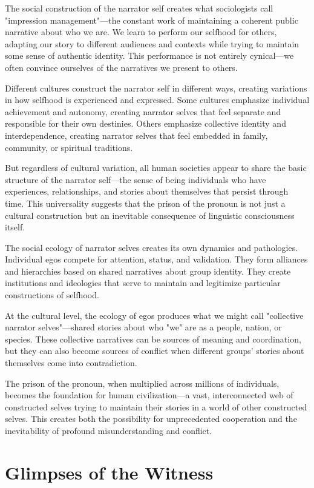 The social construction of the narrator self creates what sociologists call "impression management"—the constant work of maintaining a coherent public narrative about who we are. We learn to perform our selfhood for others, adapting our story to different audiences and contexts while trying to maintain some sense of authentic identity. This performance is not entirely cynical—we often convince ourselves of the narratives we present to others.

Different cultures construct the narrator self in different ways, creating variations in how selfhood is experienced and expressed. Some cultures emphasize individual achievement and autonomy, creating narrator selves that feel separate and responsible for their own destinies. Others emphasize collective identity and interdependence, creating narrator selves that feel embedded in family, community, or spiritual traditions.

But regardless of cultural variation, all human societies appear to share the basic structure of the narrator self—the sense of being individuals who have experiences, relationships, and stories about themselves that persist through time. This universality suggests that the prison of the pronoun is not just a cultural construction but an inevitable consequence of linguistic consciousness itself.

The social ecology of narrator selves creates its own dynamics and pathologies. Individual egos compete for attention, status, and validation. They form alliances and hierarchies based on shared narratives about group identity. They create institutions and ideologies that serve to maintain and legitimize particular constructions of selfhood.

At the cultural level, the ecology of egos produces what we might call "collective narrator selves"—shared stories about who "we" are as a people, nation, or species. These collective narratives can be sources of meaning and coordination, but they can also become sources of conflict when different groups' stories about themselves come into contradiction.

The prison of the pronoun, when multiplied across millions of individuals, becomes the foundation for human civilization—a vast, interconnected web of constructed selves trying to maintain their stories in a world of other constructed selves. This creates both the possibility for unprecedented cooperation and the inevitability of profound misunderstanding and conflict.

\section{Glimpses of the Witness}

